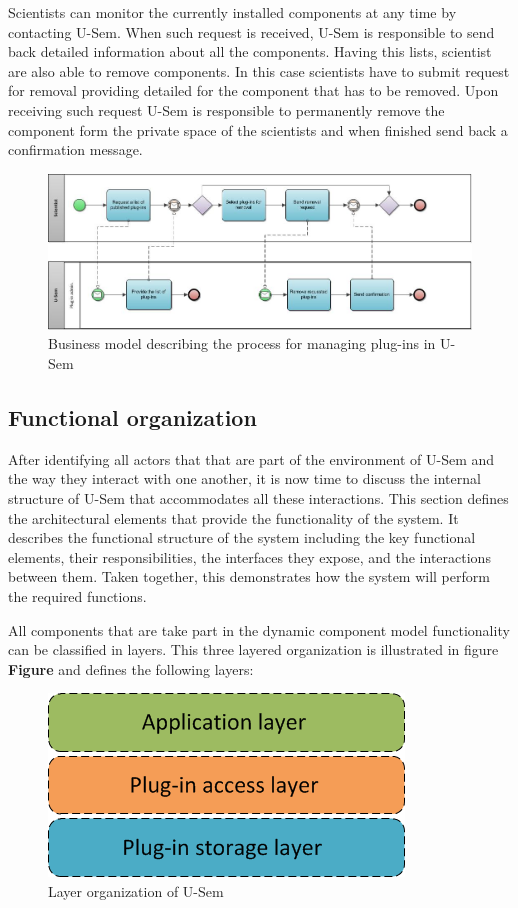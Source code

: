 Scientists can monitor the currently installed components at any time by contacting U-Sem. When such request is received, U-Sem is responsible to send back detailed information about all the components. Having this lists, scientist are also able to remove components. In this case scientists have to submit request for removal providing detailed for the component that has to be removed. Upon receiving such request U-Sem is responsible to permanently remove the component form the private space of the scientists and when finished send back a confirmation message.

\begin{figure}[h!]
  \centering
  	\includegraphics[scale=0.6]{plug-in/business_processes/PluginManagementBusinessModel.jpg}
  \caption{Business model describing the process for managing plug-ins in U-Sem}
\end{figure}


\subsection{Functional organization}

After identifying all actors that that are part of the environment of U-Sem and the way they interact with one another, it is now time to discuss the internal structure of U-Sem that accommodates all these interactions. This section defines the architectural elements that provide the functionality of the system. It describes the functional structure of the system including the key functional elements, their responsibilities, the interfaces they expose, and the interactions between them. Taken together, this demonstrates how the system will perform the required functions.

All components that are take part in the dynamic component model functionality can be classified in layers. This three layered organization is illustrated in figure \textbf{Figure} and defines the following layers:

\begin{figure}[h!]
  \centering
  	\includegraphics[scale=0.6]{plug-in/layers/layers.png}
  \caption{Layer organization of U-Sem}
\end{figure}

